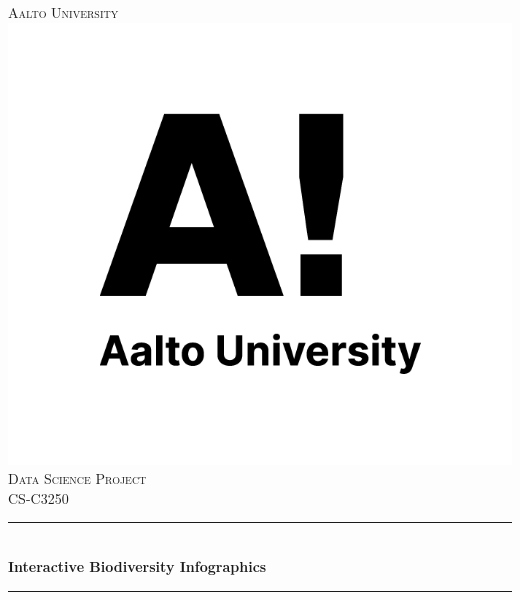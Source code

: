 \documentclass{article}
\begin{document}
\begin{titlepage}
	
	\newcommand{\HRule}{\rule{\linewidth}{0.5mm}} %
	
	\centering %
	
	
	\textsc{\LARGE Aalto University}\\[1.5cm] %
	\includegraphics[scale=0.5]{aaltologo.png}\\[1cm] %
	\textsc{\Large Data Science Project}\\[0.5cm] %
	\textsc{\large CS-C3250}\\[0.5cm] %
	
	
	\HRule \\[0.4cm]
	{ \huge \bfseries Interactive Biodiversity Infographics}\\[0.4cm] %
	\HRule \\[1.5cm]
	

\end{titlepage}
\end{document}
